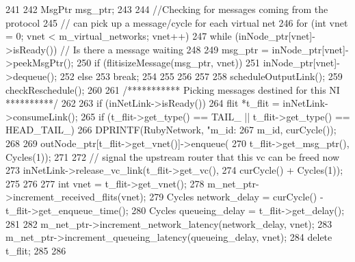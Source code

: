 \begin{DoxyCode}
241 {
242     MsgPtr msg_ptr;
243 
244     //Checking for messages coming from the protocol
245     // can pick up a message/cycle for each virtual net
246     for (int vnet = 0; vnet < m_virtual_networks; vnet++) {
247         while (inNode_ptr[vnet]->isReady()) // Is there a message waiting
248         {
249             msg_ptr = inNode_ptr[vnet]->peekMsgPtr();
250             if (flitisizeMessage(msg_ptr, vnet)) {
251                 inNode_ptr[vnet]->dequeue();
252             } else {
253                 break;
254             }
255         }
256     }
257 
258     scheduleOutputLink();
259     checkReschedule();
260 
261     /*********** Picking messages destined for this NI **********/
262 
263     if (inNetLink->isReady()) {
264         flit *t_flit = inNetLink->consumeLink();
265         if (t_flit->get_type() == TAIL_ || t_flit->get_type() == HEAD_TAIL_) {
266             DPRINTF(RubyNetwork, "m_id: %
267                     m_id, curCycle());
268 
269             outNode_ptr[t_flit->get_vnet()]->enqueue(
270                 t_flit->get_msg_ptr(), Cycles(1));
271 
272             // signal the upstream router that this vc can be freed now
273             inNetLink->release_vc_link(t_flit->get_vc(),
274                     curCycle() + Cycles(1));
275         }
276 
277         int vnet = t_flit->get_vnet();
278         m_net_ptr->increment_received_flits(vnet);
279         Cycles network_delay = curCycle() - t_flit->get_enqueue_time();
280         Cycles queueing_delay = t_flit->get_delay();
281 
282         m_net_ptr->increment_network_latency(network_delay, vnet);
283         m_net_ptr->increment_queueing_latency(queueing_delay, vnet);
284         delete t_flit;
285     }
286 }
\end{DoxyCode}


